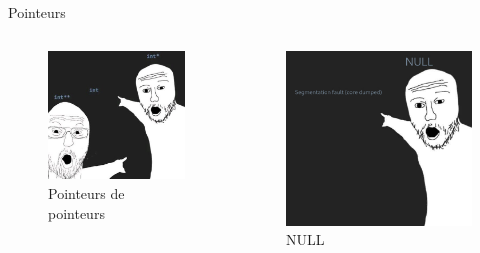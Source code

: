 \documentclass[
  10pt,
  french,
  ignorenonframetext,
  aspectratio=169,
]{beamer}
\begin{document}
\begin{frame}{Pointeurs}
\protect\hypertarget{pointeurs-1}{}
\begin{columns}[T]
\begin{column}{0.48\textwidth}
\begin{figure}
\centering
\includegraphics[width=\textwidth,height=0.8\textheight]{img/lol.jpeg}
\caption{Pointeurs de pointeurs}
\end{figure}
\end{column}

\begin{column}{0.48\textwidth}
\begin{figure}
\centering
\includegraphics[width=\textwidth,height=0.8\textheight]{img/isen4.png}
\caption{NULL}
\end{figure}
\end{column}
\end{columns}
\end{frame}
\end{document}
